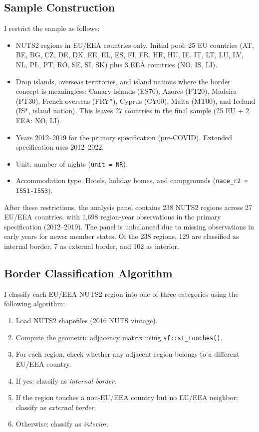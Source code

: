 \documentclass[12pt]{article}
\begin{document}
\subsection{Sample Construction}

I restrict the sample as follows:
\begin{itemize}
\item NUTS2 regions in EU/EEA countries only. Initial pool: 25 EU countries (AT, BE, BG, CZ, DE, DK, EE, EL, ES, FI, FR, HR, HU, IE, IT, LT, LU, LV, NL, PL, PT, RO, SE, SI, SK) plus 3 EEA countries (NO, IS, LI).
\item Drop islands, overseas territories, and island nations where the border concept is meaningless: Canary Islands (ES70), Azores (PT20), Madeira (PT30), French overseas (FRY*), Cyprus (CY00), Malta (MT00), and Iceland (IS*, island nation). This leaves 27 countries in the final sample (25 EU + 2 EEA: NO, LI).
\item Years 2012--2019 for the primary specification (pre-COVID). Extended specification uses 2012--2022.
\item Unit: number of nights (\texttt{unit = NR}).
\item Accommodation type: Hotels, holiday homes, and campgrounds (\texttt{nace\_r2 = I551-I553}).
\end{itemize}

After these restrictions, the analysis panel contains 238 NUTS2 regions across 27 EU/EEA countries, with 1,698 region-year observations in the primary specification (2012--2019). The panel is unbalanced due to missing observations in early years for newer member states. Of the 238 regions, 129 are classified as internal border, 7 as external border, and 102 as interior.

\subsection{Border Classification Algorithm}

I classify each EU/EEA NUTS2 region into one of three categories using the following algorithm:

\begin{enumerate}
\item Load NUTS2 shapefiles (2016 NUTS vintage).
\item Compute the geometric adjacency matrix using \texttt{sf::st\_touches()}.
\item For each region, check whether any adjacent region belongs to a different EU/EEA country.
\item If yes: classify as \textit{internal border}.
\item If the region touches a non-EU/EEA country but no EU/EEA neighbor: classify as \textit{external border}.
\item Otherwise: classify as \textit{interior}.
\end{enumerate}
\end{document}
